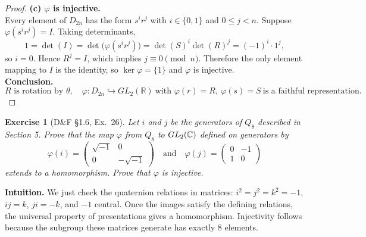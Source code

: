 \documentclass[12pt]{article}
\newtheorem{exercise}[theorem]{Exercise}
\theoremstyle{definition}
\begin{document}
\begin{proof}
\noindent\textbf{(c) $\varphi$ is injective.}\\
\noindent Every element of $D_{2n}$ has the form $s^i r^j$ with $i\in\{0,1\}$ and $0\le j<n$. Suppose $\varphi(s^i r^j)=I$. Taking determinants,
\[
1=\det(I)=\det\big(\varphi(s^i r^j)\big)=\det(S)^i\det(R)^j=(-1)^i\cdot 1^j,
\]
so $i=0$. Hence $R^j=I$, which implies $j\equiv0\pmod n$. Therefore the only element mapping to $I$ is the identity, so $\ker\varphi=\{1\}$ and $\varphi$ is injective.\\

\noindent\textbf{Conclusion.}
\[
\boxed{
\text{$R$ is rotation by }\theta,\quad
\varphi: D_{2n}\hookrightarrow GL_2(\mathbb{R})\ \text{with } \varphi(r)=R,\ \varphi(s)=S\ \text{is a faithful representation.}
}
\]
\end{proof}

\newpage

\begin{exercise}[D\&F §1.6, Ex.~26]
Let $i$ and $j$ be the generators of $Q_8$ described in Section 5. Prove that the map $\varphi$ from $Q_8$ to $GL_2(\Bbb C)$ defined on generators by
\[
\varphi(i)=
\begin{pmatrix}
\sqrt{-1}&0\\[2pt]0&-\sqrt{-1}
\end{pmatrix}
\quad\text{and}\quad
\varphi(j)=
\begin{pmatrix}
0&-1\\[2pt]1&0
\end{pmatrix}
\]
extends to a homomorphism. Prove that $\varphi$ is injective.
\end{exercise}

\dotfill

\noindent\textbf{Intuition.}
We just check the quaternion relations in matrices: $i^2=j^2=k^2=-1$, $ij=k$, $ji=-k$, and $-1$ central.  
Once the images satisfy the defining relations, the universal property of presentations gives a homomorphism.  
Injectivity follows because the subgroup these matrices generate has exactly $8$ elements.\\

\dotfill
\end{document}
